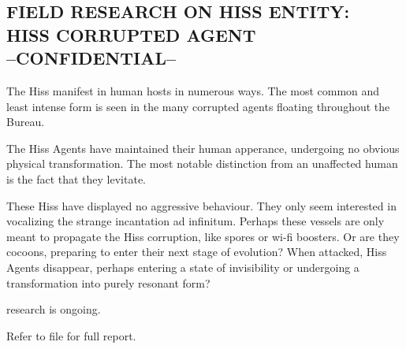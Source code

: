 \subsection*{FIELD RESEARCH ON HISS ENTITY:\\ HISS CORRUPTED AGENT\\--CONFIDENTIAL--}
\par The Hiss manifest in human hosts in numerous ways. The most common and least intense form is seen in the many corrupted agents floating throughout the Bureau.
\par The Hiss Agents have maintained their human apperance, undergoing no obvious physical transformation. The most notable distinction from an unaffected human is the fact that they levitate.
\par These Hiss have displayed no aggressive behaviour. They only seem interested in vocalizing the strange incantation ad infinitum. Perhaps these vessels are only meant to propagate the Hiss corruption, like spores or wi-fi boosters. Or are they cocoons, preparing to enter their next stage of evolution? When attacked, Hiss Agents disappear, perhaps entering a state of invisibility or undergoing a transformation into purely resonant form?
\par research is ongoing.
\par Refer to file   for full report. 
\newpage